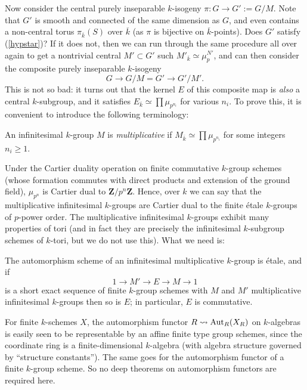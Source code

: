 \documentclass[10pt]{article}
\newcommand{\ZZ}{\mathbf{Z}}
\renewcommand{\(}{\left(}
\renewcommand{\)}{\right)}
\numberwithin{thm}{subsection}
\begin{document}
Now consider the central purely inseparable $k$-isogeny $\pi:G \rightarrow G' := G/M$.
Note that $G'$ is smooth and connected of the same dimension as
$G$, and even contains a non-central
torus $\pi_{\overline{k}}(S)$ over $\overline{k}$ (as $\pi$ is bijective on $\overline{k}$-points). 
Does $G'$ satisfy (\ref{hypstar})?   If it does not,
then we can run through the same procedure all over again
to get a nontrivial central $M' \subset G'$ such $M'_{\overline{k}} \simeq \mu_p^{N'}$,
and can then consider the composite purely inseparable $k$-isogeny
$$G \rightarrow G/M = G' \rightarrow G'/M'.$$
This is not so bad:  it turns out that the kernel $E$ of this composite map is {\em also}
a central $k$-subgroup, and it  satisfies $E_{\overline{k}} \simeq \prod \mu_{p^{n_i}}$ for
various $n_i$.  To prove this, it is convenient to introduce the following
terminology:

\begin{definition} An infinitesimal $k$-group $M$ is {\em multiplicative} if
$M_{\overline{k}} \simeq \prod \mu_{p^{n_i}}$ for some integers $n_i \ge 1$.
\end{definition}

Under the Cartier duality operation on finite commutative $k$-group schemes
(whose formation commutes with direct products and extension of the ground field), 
$\mu_{p^n}$ is Cartier dual to $\ZZ/p^n\ZZ$.  Hence,
over $k$ we can say that the multiplicative infinitesimal $k$-groups are Cartier dual
to the finite \'etale $k$-groups of $p$-power order.   The multiplicative infinitesimal
$k$-groups exhibit many properties of tori (and in fact they are precisely
the infinitesimal $k$-subgroup schemes of $k$-tori, but we do not use this).  What we need is:

\begin{lemma}\label{mstuff}  The automorphism scheme of an infinitesimal multiplicative
$k$-group is \'etale, and if
$$1 \rightarrow M' \rightarrow E \rightarrow M \rightarrow 1$$
is a short exact sequence of finite $k$-group schemes with $M$ and $M'$
multiplicative infinitesimal $k$-groups then so is $E$; in particular, 
$E$ is commutative.
\end{lemma}

For finite $k$-schemes $X$, the automorphism functor $R \rightsquigarrow {\rm{Aut}}_R(X_R)$ on $k$-algebras
is easily seen to be representable
by an affine finite type group schemes, 
since the coordinate ring is a finite-dimensional $k$-algebra (with algebra structure
governed by ``structure constants'').  The same goes for the automorphism functor
of a finite $k$-group scheme.  So no deep theorems on automorphism functors are required here. 
\end{document}
